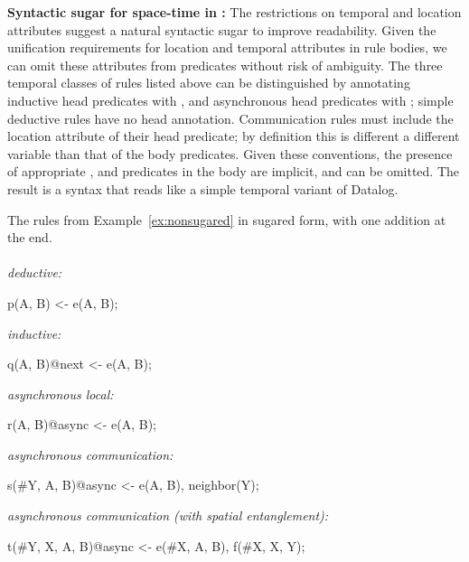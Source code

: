 \noindent
\textbf{Syntactic sugar for space-time in \lang:}
The restrictions on temporal and location attributes suggest a natural syntactic sugar to improve readability.  Given the unification requirements for location and temporal attributes in rule bodies, we can omit these attributes from predicates without risk of ambiguity.  
The three temporal classes of rules listed above can be distinguished by annotating inductive head predicates with , and asynchronous head predicates with ; simple deductive rules have no head annotation. 
Communication rules must include the location attribute of their head predicate; by definition this is different a different variable than that of the body predicates.
 Given these conventions, the presence of appropriate ,  and  predicates in the body are implicit, and can be omitted.  The result is a syntax that reads like a simple temporal variant of Datalog.
\begin{example}
\label{ex:sugared}
The rules from Example~\ref{ex:nonsugared} in sugared form, with one addition at the end.
\\\\
\textit{deductive:}\\
\begin{Dedalus}
p(A, B) <- e(A, B);
\end{Dedalus}
\textit{inductive:}\\
\begin{Dedalus}
q(A, B)@next <- e(A, B);
\end{Dedalus}
\textit{asynchronous local:}\\
\begin{Dedalus}
r(A, B)@async <- e(A, B);
\end{Dedalus}
\textit{asynchronous communication:}\\
\begin{Dedalus}
s(#Y, A, B)@async <- e(A, B), neighbor(Y);
\end{Dedalus}
\textit{asynchronous communication (with spatial entanglement):}\\
\begin{Dedalus}
t(#Y, X, A, B)@async <- e(#X, A, B), f(#X, X, Y);
\end{Dedalus}
\end{example}

